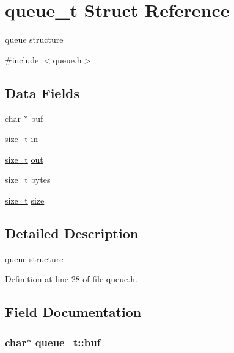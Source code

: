 \hypertarget{structqueue__t}{\section{queue\-\_\-t Struct Reference}
\label{structqueue__t}
}


queue structure  




{\ttfamily \#include $<$queue.\-h$>$}

\subsection*{Data Fields}
\begin{DoxyCompactItemize}
\item 
char $\ast$ \hyperlink{structqueue__t_aaee81421d150a17123a2b858d5b1685d}{buf}
\item 
\hyperlink{hardware_8h_aea0c7eab1ce1eebb4e879ef4e23c16ee}{size\-\_\-t} \hyperlink{structqueue__t_a7a6832e36c70a1db7fddc93fb6be9d63}{in}
\item 
\hyperlink{hardware_8h_aea0c7eab1ce1eebb4e879ef4e23c16ee}{size\-\_\-t} \hyperlink{structqueue__t_a8f6e1c623d2ceed398a71a0aab93b0fa}{out}
\item 
\hyperlink{hardware_8h_aea0c7eab1ce1eebb4e879ef4e23c16ee}{size\-\_\-t} \hyperlink{structqueue__t_a58398d4ee60bc90ffba2bc3488fe185b}{bytes}
\item 
\hyperlink{hardware_8h_aea0c7eab1ce1eebb4e879ef4e23c16ee}{size\-\_\-t} \hyperlink{structqueue__t_a83a13b888f9d4ef127d706559818b779}{size}
\end{DoxyCompactItemize}


\subsection{Detailed Description}
queue structure 

Definition at line 28 of file queue.\-h.



\subsection{Field Documentation}
\hypertarget{structqueue__t_aaee81421d150a17123a2b858d5b1685d}{
\subsubsection[{buf}]{\setlength{\rightskip}{0pt plus 5cm}char$\ast$ queue\-\_\-t\-::buf}}\label{structqueue__t_aaee81421d150a17123a2b858d5b1685d}


